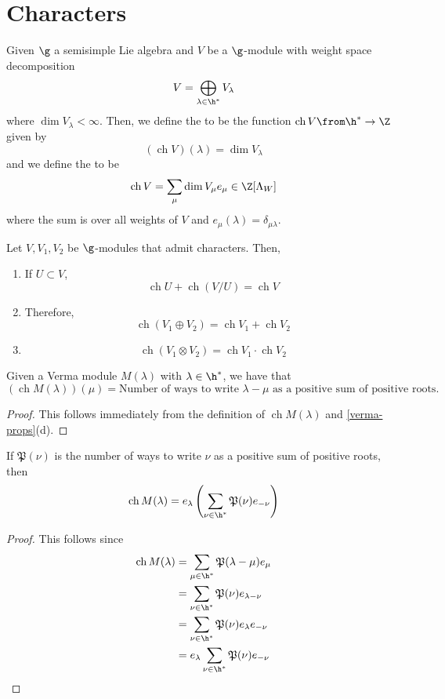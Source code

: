 \documentclass[11pt,leqno,oneside]{amsart}
\numberwithin{thm}{section}
\newcommand{\weightlattice}{\Lambda_W}
\newcommand{\ch}{\operatorname{ch}}
\newcommand{\numposrootcombos}{\mathfrak{P}}
\begin{document}
\section{Characters}
\begin{defn}
  Given \(\g\) a semisimple Lie algebra and \(V\) be a
  \(\g\)-module with weight space decomposition \[
    V = \bigoplus_{\lambda \in \h^*} V_\lambda
  \]
  where \(\dim V_{\lambda} < \infty\). Then, we define the  to be the function \(\ch V \from \h^* \to \Z\) given by \[
    (\ch V)(\lambda) = \dim V_{\lambda}
  \]
  and we define the  to be \[
    \ch V = \sum_{\mu} \dim V_{\mu} e_\mu \in \Z[\weightlattice] 
  \]
  where the sum is over all weights of \(V\) and \(e_\mu(\lambda) =
  \delta_{\mu \lambda}\). 
\end{defn}
\begin{prop}
  Let \(V,V_1,V_2\) be \(\g\)-modules that admit characters. Then,
  \begin{enumerate}
  \item If \(U \subset V\), \[
      \ch U + \ch(V/U) = \ch V
    \]
  \item Therefore, \[
      \ch(V_1 \oplus V_2) = \ch V_1 + \ch V_2
    \]
  \item \[
      \ch(V_1 \otimes V_2) = \ch V_1 \cdot \ch V_2
    \]
  \end{enumerate}
\end{prop}
\begin{lem}
  Given a Verma module \(M(\lambda)\) with \(\lambda \in \h^*\), we
  have that \[
    (\ch M(\lambda))(\mu) = \text{Number of ways to write
    }\lambda-\mu\text{ as a positive sum of positive roots.}
  \]
\end{lem}
\begin{proof}
  This follows immediately from the definition of \(\ch M(\lambda)\)
  and \ref{verma-props}(d).
\end{proof}
\begin{prop}
  If \(\numposrootcombos(\nu)\) is the number of ways to write \(\nu\)
  as a positive sum of positive roots, then \[
    \ch M(\lambda) = e_\lambda \left( \sum_{\nu \in \h^*}
      \numposrootcombos(\nu)e_{-\nu} \right) 
  \]
\end{prop}
\begin{proof}
  This follows since
  \begin{align*}
    \ch M(\lambda)
    & = \sum_{\mu \in \h^*} \numposrootcombos(\lambda-\mu)e_{\mu}\\
    & = \sum_{\nu \in \h^*} \numposrootcombos(\nu)e_{\lambda-\nu}\\
    & = \sum_{\nu \in \h^*}
    \numposrootcombos(\nu)e_{\lambda}e_{-\nu}\\
    & = e_{\lambda} \sum_{\nu \in \h^*} \numposrootcombos(\nu)e_{-\nu}
  \end{align*}
\end{proof}
\end{document}
